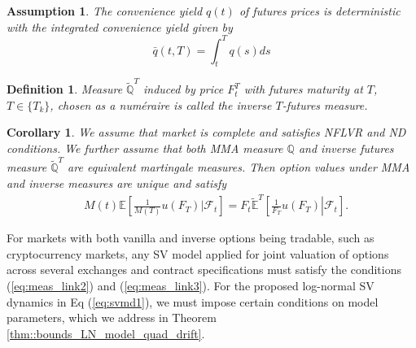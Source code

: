 \documentclass[11pt,a4paper] {article}
\newtheorem{corollary}{Corollary}[section]
\newtheorem{definition}{Definition}[section]
\newtheorem{assumption}{Assumption}[section]
\begin{document}
\begin{assumption}\label{a:r1} The convenience yield $q(t)$ of futures prices is deterministic with the integrated convenience yield given by
\begin{equation}\label{eq:r1}
\bar{q}(t, T) = \int^{T}_{t}q(s)ds
\end{equation}
\end{assumption}

\begin{definition}
Measure $\tilde{\mathbb{Q}}^{T}$ induced by price $F^{T}_t$ with futures maturity at $T$, $T\in\{T_{k}\}$, chosen as a num\'eraire is called the inverse $T$-futures measure.
\end{definition}


\begin{corollary}\label{def2} We assume that market is complete and satisfies NFLVR and ND conditions. We further assume that both MMA measure $\mathbb{Q}$ and inverse futures measure $\tilde{\mathbb{Q}}^{T}$ are equivalent martingale measures. Then option values under MMA and inverse measures are unique and satisfy
\begin{equation}\label{eq:meas_link3}
\begin{split}
& M(t)\mathbb{E}\left[\frac{1}{M(T)}\left.u(F_T)\right|\mathcal{F}_{t}\right]
=F_{t}\tilde{\mathbb{E}}^{T}\left[\left.\frac{1}{F_T}u(F_T)\right|\mathcal{F}_{t}\right].
\end{split}
\end{equation}

\end{corollary}


For markets with both vanilla and inverse options being tradable, such as cryptocurrency markets, any SV model applied for joint valuation of options across several exchanges and contract specifications must satisfy the conditions (\ref{eq:meas_link2}) and (\ref{eq:meas_link3}). For the proposed log-normal SV dynamics in Eq (\ref{eq:svmd1}), we must impose certain conditions on model parameters, which we address in Theorem \ref{thm::bounds_LN_model_quad_drift}.
\end{document}
